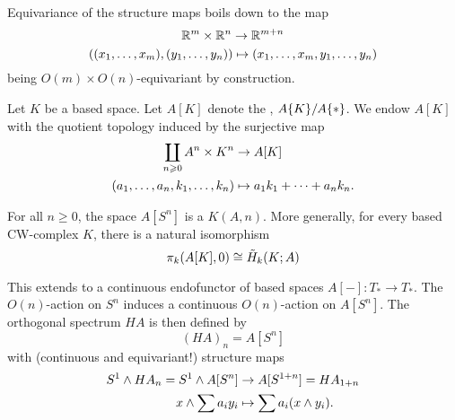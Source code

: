 Equivariance of the structure maps boils down to the map
\[{\mathbb R}^m\times{\mathbb R}^n\to{\mathbb R}^{m+n}\]
\[(({{x}_1,\dots,{x}_{m}}),({{y}_1,\dots,{y}_{n}}))\mapsto({{x}_1,\dots,{x}_{m}},{{y}_1,\dots,{y}_{n}})\]
being $O(m)\times O(n)$-equivariant by construction.

Let $K$ be a based space. Let $A[K]$ denote the , $A\{K\}/A\{*\}$. We endow $A[K]$ with the quotient topology induced by the surjective map
\begin{align*}
    \coprod_{n\geqslant0}A^n\times K^n&\to A[K]\\
    ({{a}_1,\dots,{a}_{n}},{{k}_1,\dots,{k}_{n}})&\mapsto a_1k_1+\cdots+a_nk_n.
\end{align*}

\begin{theorem**}
For all $n\geq0$, the space $A[S^n]$ is a $K(A,n)$. More generally, for every based CW-complex $K$, there is a natural isomorphism
\[\pi_k(A[K],0)\cong\tilde H_k(K;A)\]
\end{theorem**}

This extends to a continuous endofunctor of based spaces $A[-]:T_*\to T_*$. The $O(n)$-action on $S^n$ induces a continuous $O(n)$-action on $A[S^n]$. The orthogonal spectrum $HA$ is then defined by
\[(HA)_n=A[S^n]\]
with (continuous and equivariant!) structure maps
\begin{align*}
    S^1\wedge HA_n=S^1\wedge A[S^n]&\to A[S^{1+n}]=HA_{1+n}\\
    x\wedge\sum a_iy_i&\mapsto\sum a_i(x\wedge y_i).
\end{align*}
